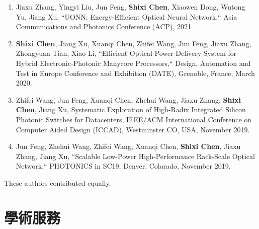 \documentclass{mycv}
\begin{document}
\begin{enumerate}
	\item Jiaxu Zhang, Yingyi Liu, Jun Feng, \textbf{Shixi Chen}, Xiaowen Dong, Wutong Yu, Jiang Xu, ``UONN: Energy-Efficient Optical Neural Network,`` Asia Communications and Photonics Conference (ACP), 2021
	\item \textbf{Shixi Chen}, Jiang Xu, Xuanqi Chen, Zhifei Wang, Jun Feng, Jiaxu Zhang, Zhongyuan Tian, Xiao Li, ``Efficient Optical Power Delivery System for Hybrid Electronic-Photonic Manycore Processors,`` Design, Automation and Test in Europe Conference and Exhibition (DATE), Grenoble, France, March 2020.
	\item Zhifei Wang, Jun Feng, Xuanqi Chen, Zhehui Wang, Jiaxu Zhang, \textbf{Shixi Chen}, Jiang Xu, Systematic Exploration of High-Radix Integrated Silicon Photonic Switches for Datacenters, IEEE/ACM International Conference on Computer Aided Design (ICCAD), Westminster CO, USA, November 2019.
	\item Jun Feng, Zhehui Wang, Zhifei Wang, Xuanqi Chen, \textbf{Shixi Chen}, Jiaxu Zhang, Jiang Xu, ``Scalable Low-Power High-Performance Rack-Scale Optical Network,`` PHOTONICS in SC19, Denver, Colorado, November 2019.
\end{enumerate}

{
\footnotesize %
\textsuperscript{\textdagger}These authors contributed equally.
}

\section{學術服務}
\end{document}

